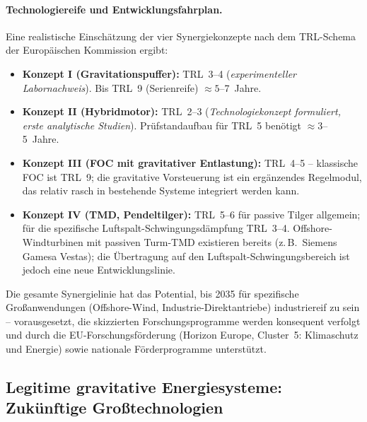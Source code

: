 ﻿\documentclass[12pt, a4paper]{report}
\theoremstyle{definition}
\theoremstyle{remark}
\begin{document}
\paragraph{Technologiereife und Entwicklungsfahrplan.}
Eine realistische Einschätzung der vier Synergiekonzepte nach dem TRL-Schema der
Europäischen Kommission ergibt:
\begin{itemize}
  \item \textbf{Konzept I (Gravitationspuffer):} TRL~3--4 (\emph{experimenteller
        Labornachweis}). Bis TRL~9 (Serienreife) $\approx 5$--7~Jahre.
  \item \textbf{Konzept II (Hybridmotor):} TRL~2--3 (\emph{Technologiekonzept
        formuliert, erste analytische Studien}). Prüfstandaufbau für TRL~5
        benötigt $\approx 3$--5~Jahre.
  \item \textbf{Konzept III (FOC mit gravitativer Entlastung):} TRL~4--5 --
        klassische FOC ist TRL~9; die gravitative Vorsteuerung ist ein ergänzendes
        Regelmodul, das relativ rasch in bestehende Systeme integriert werden kann.
  \item \textbf{Konzept IV (TMD, Pendeltilger):} TRL~5--6 für passive Tilger
        allgemein; für die spezifische Luftspalt-Schwingungsdämpfung TRL~3--4.
        Offshore-Windturbinen mit passiven Turm-TMD existieren bereits (z.\,B.\
        Siemens Gamesa Vestas); die Übertragung auf den Luftspalt-Schwingungsbereich
        ist jedoch eine neue Entwicklungslinie.
\end{itemize}
Die gesamte Synergielinie hat das Potential, bis 2035 für spezifische
Großanwendungen (Offshore-Wind, Industrie-Direktantriebe) industriereif zu sein
-- vorausgesetzt, die skizzierten Forschungsprogramme werden konsequent verfolgt
und durch die EU-Forschungs\-förderung (Horizon Europe, Cluster~5: Klimaschutz und
Energie) sowie nationale Förderprogramme unterstützt.

\subsection{Legitime gravitative Energiesysteme: Zukünftige Großtechnologien}
\end{document}
